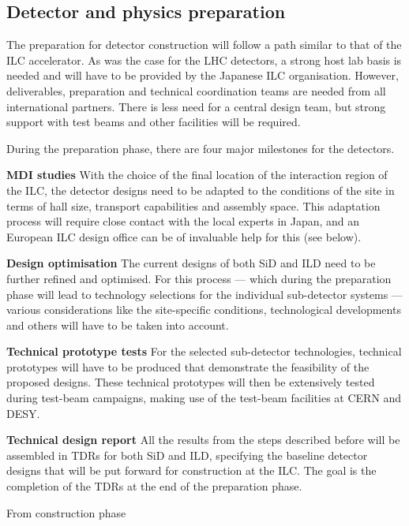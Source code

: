 \documentclass[%
 reprint,
 amsmath,amssymb,
 aps,
]{revtex4-1}
\begin{document}
\subsection{Detector and physics preparation~\label{sec:prepphase:detectors}}
The preparation for detector construction will follow a path similar to
that of the \acs{ILC} accelerator.
As was the case for the LHC detectors, a strong host lab basis is needed
and will have to be provided by the Japanese ILC organisation.
However, deliverables, preparation and technical coordination teams are
needed from all international partners.
There is less need for a central design team, but strong support with
test beams and other facilities will be required.

During the preparation phase, there are four major milestones for the
detectors.
\begin{description}
\item{\bfseries MDI studies}
With the choice of the final location of the interaction region of the
ILC, the detector designs need to be adapted to the
conditions of the site in terms of hall size, transport capabilities and
assembly space. This adaptation process
will require close contact with the local experts in Japan,
and an European ILC design office can be of invaluable help for this
(see below).
\item{\bfseries Design optimisation}
The current designs of both SiD and ILD need to be further refined and
optimised. For this process --- which during the
preparation phase will lead to technology selections for the individual
sub-detector systems --- various considerations like
the site-specific conditions, technological developments and others will
have to be taken into account. 
\item{\bfseries Technical prototype tests}
For the selected sub-detector technologies, technical prototypes will
have to be produced that demonstrate the feasibility of the proposed
designs.
These technical prototypes will then be extensively tested during
test-beam campaigns, making use of the test-beam facilities at CERN and
DESY.
\item{\bfseries Technical design report}
All the results from the steps described before will be assembled in
TDRs for both SiD and ILD, specifying the
baseline detector designs that will be put forward for construction at
the ILC. The goal
is the completion of the TDRs at the end of the preparation phase.
\end{description}


From construction phase
\end{document}
